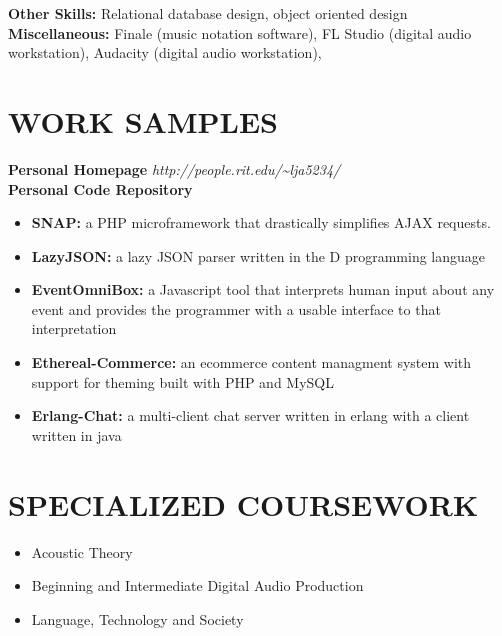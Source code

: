 \documentclass[line,margin]{res}
\begin{document}
\begin{resume}
\begin{tabbing}
	{\bf Other Skills:} \> Relational database design, object oriented design \\
	
	{\bf Miscellaneous: } \> Finale (music notation software), FL Studio (digital audio \\ 
				 \>workstation),  Audacity (digital audio workstation), 
	\end{tabbing}
	
 
\section{WORK SAMPLES} 
\vspace{-2ex}
\begin{tabbing}
{\bf Personal Homepage} \hspace{.5in}   \= {\sl http://people.rit.edu/\textasciitilde{}lja5234/} \\
{\bf Personal Code Repository}	
\end{tabbing}
  \begin{itemize}  \itemsep -2pt %
\item {\bf SNAP:} a PHP microframework that drastically simplifies AJAX requests.
\item {\bf LazyJSON:} a lazy JSON parser written in the D programming language
\item {\bf EventOmniBox:} a Javascript tool that interprets human input about any event and provides the programmer with a usable interface to that interpretation
\item {\bf Ethereal-Commerce:} an ecommerce content managment system with support for theming built with PHP and MySQL
\item {\bf Erlang-Chat: } a multi-client chat server written in erlang with a client written in java
\end{itemize}



\section{SPECIALIZED COURSEWORK}
\begin{itemize} \itemsep -2pt
\item Acoustic Theory
\item Beginning and Intermediate Digital Audio Production 
\item Language, Technology and Society
\end{itemize}
 

\end{resume}
\end{document}
